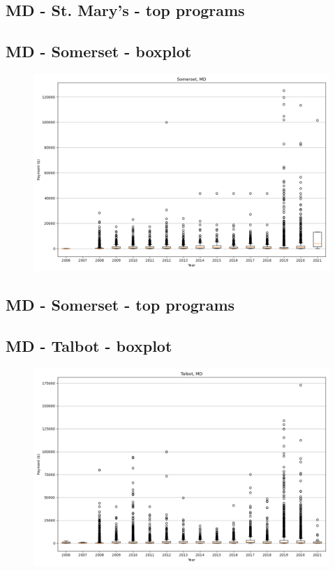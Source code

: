 \subsection*{MD - St. Mary's - top programs}

\newpage
\subsection*{MD - Somerset - boxplot}
\begin{figure}[h]
\centering
\includegraphics[width=7in]{../output/boxplots/counties/Somerset-MD_boxplot.png}
\end{figure}


\subsection*{MD - Somerset - top programs}

\newpage
\subsection*{MD - Talbot - boxplot}
\begin{figure}[h]
\centering
\includegraphics[width=7in]{../output/boxplots/counties/Talbot-MD_boxplot.png}
\end{figure}


